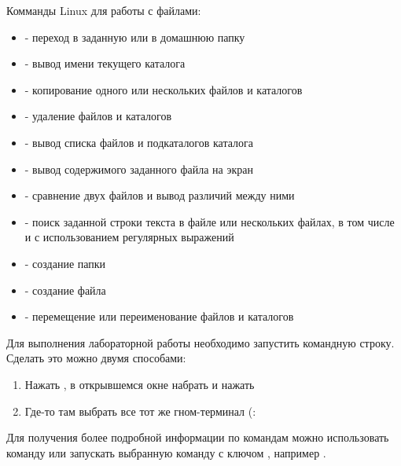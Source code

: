 \documentclass[a4paper,12pt]{article}
\begin{document}
  
  \begin{flushleft}
    Комманды Linux для работы с файлами:
    \begin{itemize}
      \item {} - переход в заданную или в домашнюю папку
      \item {} - вывод имени текущего каталога
      \item {} - копирование одного или нескольких файлов и каталогов
      \item {} - удаление файлов и каталогов
      \item {} - вывод списка файлов и подкаталогов каталога
      \item {} - вывод содержимого заданного файла на экран
      \item {} - сравнение двух файлов и вывод различий между ними
      \item {} - поиск заданной строки текста в файле или нескольких файлах, в том числе и с использованием регулярных выражений
      \item {} - создание папки
      \item {} - создание файла
      \item {} - перемещение или переименование файлов и каталогов
    \end{itemize}
  \end{flushleft}
  
  \begin{flushleft}
    Для выполнения лабораторной работы необходимо запустить командную строку. Сделать это можно двумя способами:
    \begin{enumerate}
      \item Нажать , в открывшемся окне набрать  и нажать 
      \item Где-то там выбрать все тот же гном-терминал (:
    \end{enumerate}
  \end{flushleft}
  
  \begin{flushleft}
    Для получения более подробной информации по командам можно использовать команду  или запускать выбранную команду с ключом , например .
  \end{flushleft}
  
\end{document}
